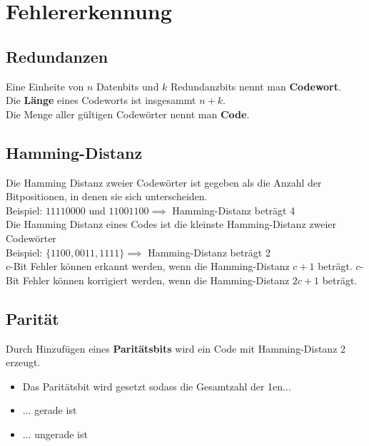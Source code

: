 \documentclass[12pt]{article}
\begin{document}
\section{Fehlererkennung}
\subsection{Redundanzen}
Eine Einheite von $n$ Datenbits und $k$ Redundanzbits nennt man \textbf{Codewort}.\\
Die \textbf{Länge} eines Codeworts ist insgesammt $n+k$.\\
Die Menge aller gültigen Codewörter nennt man \textbf{Code}.
\subsection{Hamming-Distanz}
Die Hamming Distanz zweier Codewörter ist gegeben als die Anzahl der Bitpositionen, in denen sie sich unterscheiden. \\
\indent Beispiel: $11110000$ und $11001100 \implies$ Hamming-Distanz beträgt 4 \\ \newline 
Die Hamming Distanz eines Codes ist die kleinste Hamming-Distanz zweier Codewörter \\
\indent Beispiel: $\{1100, 0011, 1111\} \implies$ Hamming-Distanz beträgt 2 \\ \newline
$c$-Bit Fehler können erkannt werden, wenn die Hamming-Distanz $c+1$ beträgt.
$c$-Bit Fehler können korrigiert werden, wenn die Hamming-Distanz $2c+1$ beträgt.
\subsection{Parität}
Durch Hinzufügen eines \textbf{Paritätsbits} wird ein Code mit Hamming-Distanz 2 erzeugt.
\begin{itemize}
    \item[] Das Paritätsbit wird gesetzt sodass die Gesamtzahl der 1en...
    \item[] ... gerade ist
    \item[] ... ungerade ist
\end{itemize}
\end{document}
